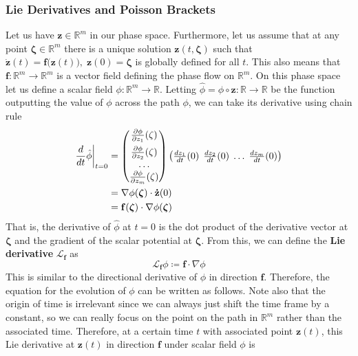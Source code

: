 \documentclass{article}
\theoremstyle{remark}
\theoremstyle{definition}
\begin{document}
\subsubsection{Lie Derivatives and Poisson Brackets}
Let us have $\mathbf{z} \in \mathbb{R}^m$ in our phase space. Furthermore, let us assume that at any point $\boldsymbol{\zeta} \in \mathbb{R}^m$ there is a unique solution $\mathbf{z}(t, \boldsymbol{\zeta})$ such that $\mathbf{\dot{z}}(t) = \mathbf{f}\big(\mathbf{z}(t)\big), \; \mathbf{z}(0) = \boldsymbol{\zeta}$ is globally defined for all $t$. This also means that $\mathbf{f}: \mathbb{R}^m \longrightarrow \mathbb{R}^m$ is a vector field defining the phase flow on $\mathbb{R}^m$. On this phase space let us define a scalar field $\phi: \mathbb{R}^m \longrightarrow \mathbb{R}$. Letting $\hat{\phi} = \phi \circ \mathbf{z}: \mathbb{R} \longrightarrow \mathbb{R}$ be the function outputting the value of $\phi$ across the path $\phi$, we can take its derivative using chain rule
\begin{align*}
    \frac{d}{dt} \hat{\phi} \bigg|_{t=0} & = \begin{pmatrix}
    \frac{\partial \phi}{\partial z_1} (\zeta) \\[0.5em]
    \frac{\partial \phi}{\partial z_2} (\zeta) \\
    \ldots \\ 
    \frac{\partial \phi}{\partial z_m} (\zeta) \end{pmatrix} 
    \begin{pmatrix}
    \frac{d z_1}{dt} (0) &\hspace{-2mm} \frac{d z_2}{dt} (0) &\hspace{-2mm} \ldots &\hspace{-2mm} \frac{d z_m}{dt} (0) \end{pmatrix} \\
    & = \nabla \phi(\boldsymbol{\zeta}) \cdot \mathbf{\dot{z}} (0) \\ 
    & = \mathbf{f}(\boldsymbol{\zeta}) \cdot \nabla \phi(\boldsymbol{\zeta}) 
\end{align*}
That is, the derivative of $\hat{\phi}$ at $t = 0$ is the dot product of the derivative vector at $\boldsymbol{\zeta}$ and the gradient of the scalar potential at $\boldsymbol{\zeta}$. From this, we can define the \textbf{Lie derivative} $\mathcal{L}_\mathbf{f}$ as 
\[\mathcal{L}_\mathbf{f} \phi \coloneqq \mathbf{f} \cdot \nabla \phi\]
This is similar to the directional derivative of $\phi$ in direction $\mathbf{f}$. Therefore, the equation for the evolution of $\phi$ can be written as follows. Note also that the origin of time is irrelevant since we can always just shift the time frame by a constant, so we can really focus on the point on the path in $\mathbb{R}^m$ rather than the associated time. Therefore, at a certain time $t$ with associated point $\mathbf{z}(t)$, this Lie derivative at $\mathbf{z}(t)$ in direction $\mathbf{f}$ under scalar field $\phi$ is 
\end{document}
